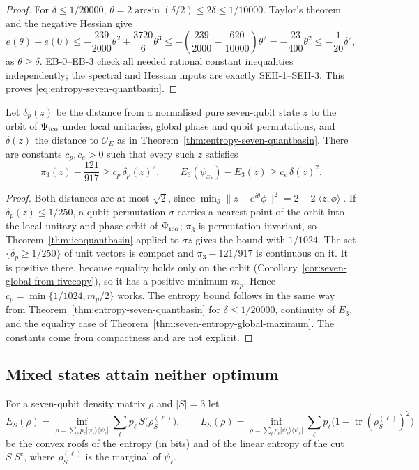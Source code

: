 \begin{proof}
For $\delta\le1/20000$,
$\theta=2\arcsin(\delta/2)\le2\delta\le1/10000$.
Taylor's theorem and the negative Hessian give
\[
 e(\theta)-e(0)
 \le-\frac{239}{2000}\theta^2
       +\frac{3720}{6}\theta^3
 \le-\left(\frac{239}{2000}-\frac{620}{10000}\right)
       \theta^2
 =-\frac{23}{400}\theta^2
 \le-\frac1{20}\delta^2,
\]
as $\theta\ge\delta$.
EB-0--EB-3 check all needed rational constant
inequalities independently; the spectral and Hessian
inputs are exactly SEH-1--SEH-3. This proves
\eqref{eq:entropy-seven-quantbasin}.
\end{proof}

\begin{corollary}\label{cor:seven-global-quadratic}
Let $\delta_p(z)$ be the distance from a normalised pure seven-qubit state $z$ to the orbit of $\Psi_{\mathrm{ico}}$ under local
unitaries, global phase and qubit permutations, and $\delta(z)$ the distance to $\mathcal O_E$ as in
Theorem~\ref{thm:entropy-seven-quantbasin}. There are constants $c_p,c_e>0$ such that every such $z$ satisfies
\[
 \pi_3(z)-\frac{121}{917}\ge c_p\,\delta_p(z)^2,\qquad
 E_3(\psi_{x_*})-E_3(z)\ge c_e\,\delta(z)^2 .
\]
\end{corollary}
\begin{proof}
Both distances are at most $\sqrt2$, since $\min_\theta\|z-e^{i\theta}\phi\|^2=2-2|\langle z,\phi\rangle|$. If
$\delta_p(z)\le1/250$, a qubit permutation $\sigma$ carries a nearest point of the orbit into the local-unitary and
phase orbit of $\Psi_{\mathrm{ico}}$; $\pi_3$ is permutation invariant, so Theorem~\ref{thm:icoquantbasin} applied to $\sigma z$
gives the bound with $1/1024$. The set $\{\delta_p\ge1/250\}$ of unit vectors is compact and $\pi_3-121/917$ is
continuous on it. It is positive there, because equality holds only on the orbit
(Corollary~\ref{cor:seven-global-from-fivecopy}), so it has a positive minimum $m_p$. Hence
$c_p=\min\{1/1024,m_p/2\}$ works. The entropy bound follows in the same way from
Theorem~\ref{thm:entropy-seven-quantbasin} for $\delta\le1/20000$, continuity of $E_3$, and the equality case of
Theorem~\ref{thm:seven-entropy-global-maximum}. The constants come from compactness and are not explicit.
\end{proof}

\subsection{Mixed states attain neither optimum}\label{sec:seven-mixed-roofs}
For a seven-qubit density matrix $\rho$ and $|S|=3$ let
\[
 E_S(\rho)=\inf_{\rho=\sum_\ell p_\ell|\psi_\ell\rangle\langle\psi_\ell|}\sum_\ell p_\ell\,S\bigl(\rho_S^{(\ell)}\bigr),\qquad
 L_S(\rho)=\inf_{\rho=\sum_\ell p_\ell|\psi_\ell\rangle\langle\psi_\ell|}\sum_\ell p_\ell\bigl(1-\operatorname{tr}(\rho_S^{(\ell)})^2\bigr)
\]
be the convex roofs of the entropy (in bits) and of the linear entropy of the cut $S|S^c$, where $\rho_S^{(\ell)}$ is the
marginal of $\psi_\ell$.

